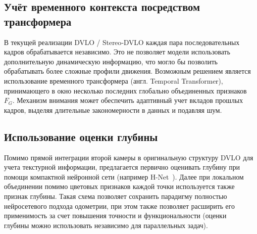 \subsection{Учёт временного контекста посредством трансформера}
\label{subsec:temporal_transformer}

В текущей реализации DVLO / Stereo‑DVLO каждая пара
последовательных кадров обрабатывается независимо.
Это не позволяет модели использовать дополнительную динамическую информацию, 
что могло бы позволить обрабатывать более сложные профили движения.
Возможным решением является использование 
временного трансформера (англ. Temporal Transformer), принимающего в окно несколько 
последних глобально объединенных признаков ${F}_{G}$.
Механизм внимания может обеспечить адаптивный учет вкладов прошлых кадров,
выделяя длительные закономерности в данных и подавляя шум.

\subsection{Использование оценки глубины}
\label{subsec:stereo_depth}

Помимо прямой интеграции второй камеры в оригинальную структуру DVLO 
для учета текстурной информации, предлагается первично оценивать глубину при 
помощи компактной нейронной сети (например H-Net~\cite{huang2022h}). Далее
при локальном объединении помимо цветовых признаков каждой точки используется 
также признак глубины. Такая схема позволяет сохранить парадигму полностью нейросетевого 
подхода одометрии, при этом также позволяет расширить его применимость за счет повышения 
точности и функциональности (оценки глубины можно использовать независимо для параллельных задач).


